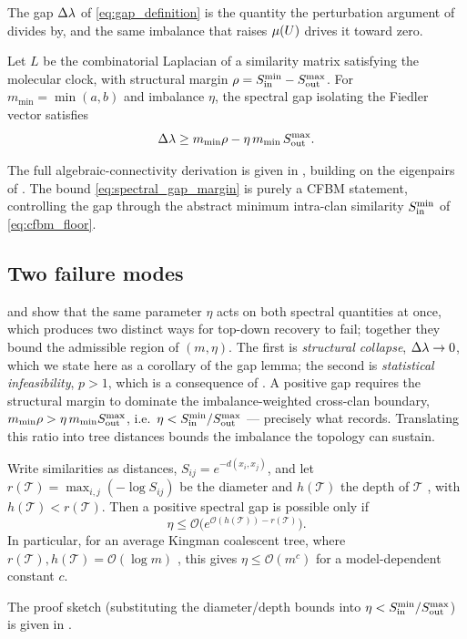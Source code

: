 The gap $\Delta\lambda$ of \eqref{eq:gap_definition} is the quantity the perturbation
argument of  divides by, and the same imbalance that raises $\mu(U)$
drives it toward zero.

\begin{lemma}\label{lem:gap}
Let $L$ be the combinatorial Laplacian of a similarity matrix satisfying the
molecular clock, with structural margin $\rho=S_{\mathrm{in}}^{\min}-S_{\mathrm{out}}^{\max}$. For
$m_{\min}=\min(a,b)$ and imbalance $\eta$, the spectral gap isolating the Fiedler
vector satisfies
\begin{equation}\label{eq:spectral_gap_margin}
   \Delta\lambda \ge m_{\min}\rho-\eta\,m_{\min}\,S_{\mathrm{out}}^{\max}.
\end{equation}
\end{lemma}
\noindent The full algebraic-connectivity derivation is given in ,
building on the eigenpairs of . The bound
\eqref{eq:spectral_gap_margin} is purely a CFBM statement, controlling the gap
through the abstract minimum intra-clan similarity $S_{\mathrm{in}}^{\min}$ of
\eqref{eq:cfbm_floor}.

\subsection{Two failure modes}\label{sec:bridging-failure}

 and  show that the same parameter $\eta$ acts
on both spectral quantities at once, which produces two distinct ways for
top-down recovery to fail; together they bound the admissible region of
$(m,\eta)$. The first is \emph{structural collapse},
$\Delta\lambda\to0$, which we state here as a corollary of the gap lemma; the second is
\emph{statistical infeasibility}, $p>1$, which is a consequence of
. A positive gap requires the structural margin to
dominate the imbalance-weighted cross-clan boundary,
$m_{\min}\rho>\eta\,m_{\min}S_{\mathrm{out}}^{\max}$, i.e.\
$\eta<S_{\mathrm{in}}^{\min}/S_{\mathrm{out}}^{\max}$ --- precisely what  records.
Translating this
ratio into tree distances bounds the imbalance the topology can sustain.

\begin{corollary}\label{cor:tolerance}
Write similarities as distances, $S_{ij}=e^{-d(x_i,x_j)}$, and let
$r(\mathcal T)=\max_{i,j}(-\log S_{ij})$ be the diameter and $h(\mathcal T)$ the
depth of $\mathcal T$ \cite{aizenbud2023spectral}, with $h(\mathcal T)<r(\mathcal T)$.
Then a positive spectral gap is possible only if
\begin{equation}\label{eq:eta_distance_bound}
   \eta\le\mathcal O\!\bigl(e^{\mathcal O(h(\mathcal T))-r(\mathcal T)}\bigr).
\end{equation}
In particular, for an average Kingman coalescent tree, where
$r(\mathcal T),h(\mathcal T)=\mathcal O(\log m)$
\cite{erdos1999logs, aldous2001stochastic}, this gives $\eta\le\mathcal O(m^c)$ for
a model-dependent constant $c$.
\end{corollary}
\noindent The proof sketch (substituting the diameter/depth bounds into
$\eta<S_{\mathrm{in}}^{\min}/S_{\mathrm{out}}^{\max}$) is given in \Cref{app:comp1}.

